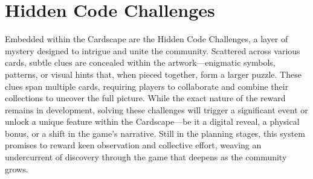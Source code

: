 \section{Hidden Code Challenges}

Embedded within the Cardscape are the Hidden Code Challenges, a layer of mystery designed to intrigue and unite the community. Scattered across various cards, subtle clues are concealed within the artwork---enigmatic symbols, patterns, or visual hints that, when pieced together, form a larger puzzle. These clues span multiple cards, requiring players to collaborate and combine their collections to uncover the full picture. While the exact nature of the reward remains in development, solving these challenges will trigger a significant event or unlock a unique feature within the Cardscape---be it a digital reveal, a physical bonus, or a shift in the game’s narrative. Still in the planning stages, this system promises to reward keen observation and collective effort, weaving an undercurrent of discovery through the game that deepens as the community grows.